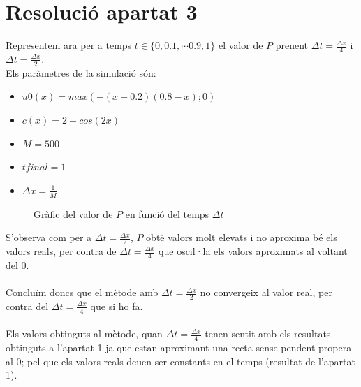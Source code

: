\documentclass[a4paper, 11pt]{article}
\begin{document}
\section{Resolució apartat 3}
Representem ara per a temps $t \in \{  0, 0.1, \cdots 0.9, 1\}$ el valor de $P$ prenent $\Delta t = \frac{\Delta x}{4}$ i $\Delta t = \frac{\Delta x}{2}$. \\
Els paràmetres de la simulació són:
\begin{itemize}
    \item $u0(x) = max(-(x - 0.2)(0.8 - x); 0)$
    \item $c(x) = 2 + cos(2x)$
    \item $M = 500$
    \item $tfinal = 1$
    \item $\Delta x = \frac{1}{M}$
\end{itemize}
\begin{figure}[h]
\captionsetup[subfigure]{labelformat=empty}
\centering
   \caption{Gràfic del valor de $P$ en funció del temps $\Delta t$}
\end{figure}
S'observa com per a $\Delta t = \frac{\Delta x}{2}$, $P$ obté valors molt elevats  i no aproxima bé els valors reals, per contra de $\Delta t = \frac{\Delta x}{4}$ que oscil·la els valors aproximats al voltant del 0.\\\\
Concluïm doncs que el mètode amb $\Delta t = \frac{\Delta x}{2}$ no convergeix al valor real, per contra del $\Delta t = \frac{\Delta x}{4}$ que si ho fa.\\\\
Els valors obtinguts al mètode, quan  $\Delta t = \frac{\Delta x}{4}$ tenen sentit amb els resultats obtinguts a l'apartat 1 ja que estan aproximant una recta sense pendent propera al 0; pel que els valors reals deuen ser constants en el temps (resultat de l'apartat 1).
\newpage
\end{document}
